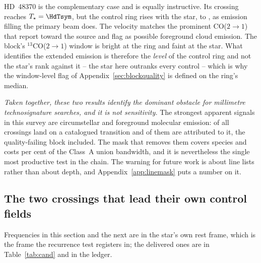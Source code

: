 

HD~48370 is the complementary case and is equally instructive. Its crossing
reaches $T_\star=\HdTsym$, but the control ring rises with the star, to
\HdRingMax, as emission filling the primary beam does. The velocity matches
the prominent CO($2{\to}1$) that \citet{Cataldi2023} report toward the
source and flag as possible foreground cloud emission. The block's
$^{13}$CO($2{\to}1$) window is bright at the ring and faint at the star.
What identifies the extended emission is therefore the \emph{level} of the
control ring and not the star's rank against it -- the star here outranks
every control -- which is why the window-level flag of
Appendix~\ref{sec:blockquality} is defined on the ring's median.

\emph{Taken together, these two results identify the dominant obstacle for
millimetre technosignature searches, and it is not sensitivity.} The
strongest apparent signals in this survey are circumstellar and
foreground molecular emission: \MkNCoinc{} of all \NCross{} crossings land
on a catalogued transition and \NAttributed{} of them are attributed to it,
the quality-failing block included. The mask that
removes them covers \FrNSpec{} species and costs \MkMaskAPct{} per cent of
the Class~A union bandwidth, and it is nevertheless the single most
productive test in the chain. The warning for
future work is about line lists rather than about depth, and
Appendix~\ref{app:linemask} puts a number on it.

\subsection{The two crossings that lead their own control fields}
\label{sec:vistest}

Frequencies in this section and the next are in the star's own rest frame,
which is the frame the recurrence test registers in; the delivered ones are in
Table~\ref{tab:cand} and in the ledger.

